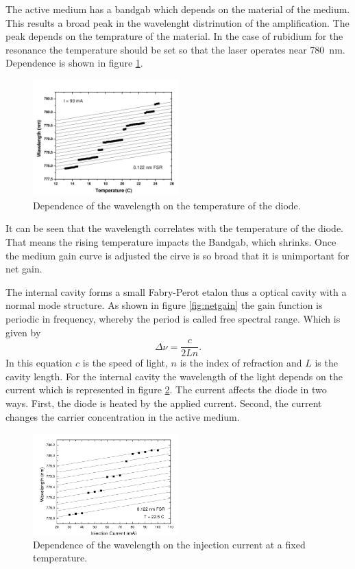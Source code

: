 The active medium has a bandgab which depends on the material of the medium. This results a broad peak in the wavelenght distrinution of the amplification.
The peak depends on the temprature of the material. In the case of rubidium for the resonance the temperature should be set so that the laser operates near 
\qty{780}{\nano\meter}.
Dependence is shown in figure \ref{fig:temp}.
\begin{figure}[H]
    \centering
    \includegraphics[width=0.5\textwidth]{content/graphics/wavelenghttotemperature.jpg}
    \caption{Dependence of the wavelength on the temperature of the diode.\cite{diode_laser}} %
    \label{fig:temp}
\end{figure}
It can be seen that the wavelength correlates with the temperature of the diode.
That means the rising temperature impacts the Bandgab, which shrinks.
Once the medium gain curve is adjusted the cirve is so broad that it is unimportant for net gain.

The internal cavity forms a small Fabry-Perot etalon thus a optical cavity with a normal mode structure. As shown in figure \ref{fig:netgain} the gain function
is periodic in frequency, whereby the period is called free spectral range. Which is given by
\begin{equation}
    \Delta \nu = \frac{c}{2Ln}.
\end{equation}
In this equation $c$ is the speed of light, $n$ is the index of refraction and $L$ is the cavity length.
For the internal cavity the wavelength of the light depends on the current which is represented in figure \ref{fig:cur}.
The current affects the diode in two ways. First, the diode is heated by the applied current. Second, the current changes the carrier concentration
in the active medium.
\begin{figure}[H]
    \centering
    \includegraphics[width=0.5\textwidth]{content/graphics/current.jpg}
    \caption{Dependence of the wavelength on the injection current at a fixed temperature.\cite{diode_laser}} %
    \label{fig:cur}
\end{figure}

